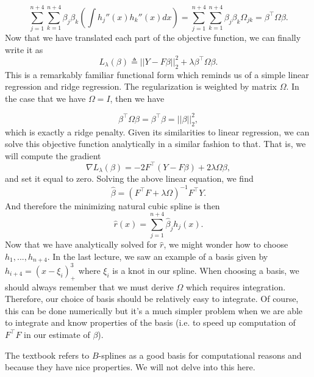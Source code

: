 \begin{equation*}
    \sum_{j=1}^{n+4}\sum_{k=1}^{n+4} \beta_j\beta_k \left( \int h_j''(x)h_k''(x)dx \right) = \sum_{j=1}^{n+4}\sum_{k=1}^{n+4} \beta_j\beta_k\Omega_{jk} = \beta^\top \Omega \beta.
\end{equation*}
Now that we have translated each part of the objective function, we can finally write it as
\begin{equation*}
    L_\lambda(\beta) \triangleq ||Y - F\beta||_2^2 + \lambda \beta^\top \Omega \beta.
\end{equation*}
This is a remarkably familiar functional form which reminds us of a simple linear regression and ridge regression. The regularization is weighted by matrix $\Omega$. In the case that we have $\Omega = I$, then we have

$$\beta^\top \Omega \beta = \beta^\top \beta = ||\beta||_2^2,$$
which is exactly a ridge penalty.
Given its similarities to linear regression, we can solve this objective function analytically in a similar fashion to that. That is, we will compute the gradient
\begin{equation*}
    \nabla L_\lambda(\beta) = -2F^\top (Y - F\beta) + 2\lambda \Omega\beta,
\end{equation*}
and set it equal to zero. Solving the above linear equation, we find
\begin{equation*}
    \hat\beta = (F^\top F + \lambda\Omega)^{-1} F^\top Y.
\end{equation*}
And therefore the minimizing natural cubic spline is then
\begin{equation*}
    \hat{r}(x) = \sum_{j=1}^{n+4} \hat\beta_jh_j(x). 
\end{equation*}
Now that we have analytically solved for $\hat{r}$, we might wonder how to choose $h_1, ..., h_{n+4}$. In the last lecture, we saw an example of a basis given by $h_{i+4} = (x - \xi_i)_+^3$ where $\xi_i$ is a knot in our spline. When choosing a basis, we should always remember that we must derive $\Omega$ which requires integration. Therefore, our choice of basis should be relatively easy to integrate. Of course, this can be done numerically but it's a much simpler problem when we are able to integrate and know properties of the basis (i.e. to speed up computation of $F^\top F$ in our estimate of $\beta$). 

The textbook refers to $B$-splines as a good basis for computational reasons and because they have nice properties. We will not delve into this here.

